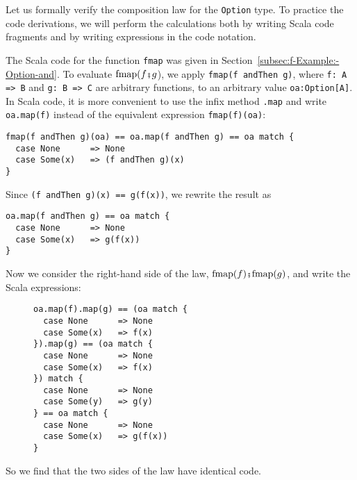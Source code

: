 Let us formally verify the composition law for the \lstinline!Option!
type. To practice the code derivations, we will perform the calculations
both by writing Scala code fragments and by writing expressions in
the code notation.

The Scala code for the function \lstinline!fmap! was given in Section~\ref{subsec:f-Example:-Option-and}.
To evaluate $\text{fmap}(f\bef g$), we apply \lstinline!fmap(f andThen g)!,
where \lstinline!f: A => B! and \lstinline!g: B => C! are arbitrary
functions, to an arbitrary value \lstinline!oa:Option[A]!. In Scala
code, it is more convenient to use the infix method \lstinline!.map!
and write \lstinline!oa.map(f)! instead of the equivalent expression
\lstinline!fmap(f)(oa)!:
\begin{lstlisting}
fmap(f andThen g)(oa) == oa.map(f andThen g) == oa match {
  case None      => None
  case Some(x)   => (f andThen g)(x)
}
\end{lstlisting}
Since \lstinline!(f andThen g)(x) == g(f(x))!, we rewrite the result
as
\begin{lstlisting}
oa.map(f andThen g) == oa match {
  case None      => None
  case Some(x)   => g(f(x))
}
\end{lstlisting}
Now we consider the right-hand side of the law, $\text{fmap}(f)\bef\text{fmap}(g)$,
and write the Scala expressions:

\begin{wrapfigure}{l}{0.33\columnwidth}%
\vspace{-0.8\baselineskip}
\begin{lstlisting}
oa.map(f).map(g) == (oa match {
  case None      => None
  case Some(x)   => f(x)
}).map(g) == (oa match {
  case None      => None
  case Some(x)   => f(x)
}) match {
  case None      => None
  case Some(y)   => g(y)
} == oa match {
  case None      => None
  case Some(x)   => g(f(x))
}
\end{lstlisting}
\vspace{-7\baselineskip}
\end{wrapfigure}%

\noindent So we find that the two sides of the law have identical
code.

